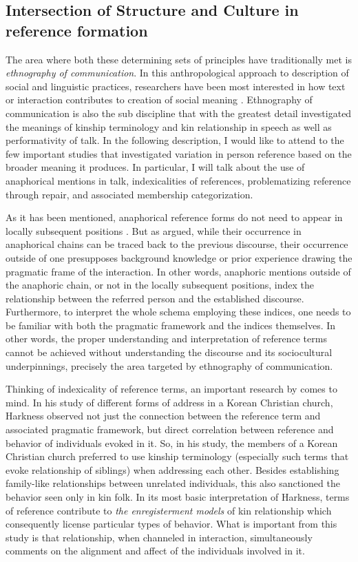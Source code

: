 \documentclass[12pt]{article}
\begin{document}
\subsection{Intersection of Structure and Culture in reference formation}
The area where both these determining sets of principles have traditionally met is \textit{ethnography of communication}. In this anthropological approach to description of social and linguistic practices, researchers have been most interested in how text or interaction contributes to creation of social meaning \parencite{hymes1989}. Ethnography of communication is also the sub discipline that with the greatest detail investigated the meanings of kinship terminology and kin relationship in speech as well as performativity of talk. In the following description, I would like to attend to the few important studies that investigated variation in person reference based on the broader meaning it produces. In particular, I will talk about the use of anaphorical mentions in talk, indexicalities of references, problematizing reference through repair, and associated membership categorization. 

As it has been mentioned, anaphorical reference forms do not need to appear in locally subsequent positions \parencite{schegloff1996}. But as \textcite{hanks2007} argued, while their occurrence in anaphorical chains can be traced back to the previous discourse, their occurrence outside of one presupposes background knowledge or prior experience drawing the pragmatic frame of the interaction. In other words, anaphoric mentions outside of the anaphoric chain, or not in the locally subsequent positions, index the relationship between the referred person and the established discourse. Furthermore, to interpret the whole schema employing these indices, one needs to be familiar with both the pragmatic framework and the indices themselves. In other words, the proper understanding and interpretation of reference terms cannot be achieved without understanding the discourse and its sociocultural underpinnings, precisely the area targeted by ethnography of communication.

Thinking of indexicality of reference terms, an important research by \textcite{harkness2015} comes to mind. In his study of different forms of address in a Korean Christian church, Harkness observed not just the connection between the reference term and associated pragmatic framework, but direct correlation between reference and behavior of individuals evoked in it. So, in his study, the members of a Korean Christian church preferred to use kinship terminology (especially such terms that evoke relationship of siblings) when addressing each other. Besides establishing family-like relationships between unrelated individuals, this also sanctioned the behavior seen only in kin folk. In its most basic interpretation of Harkness, terms of reference contribute to \textit{the enregisterment models} of kin relationship which consequently license particular types of behavior. What is important from this study is that relationship, when channeled in interaction, simultaneously comments on the alignment and affect of the individuals involved in it. 
\end{document}
